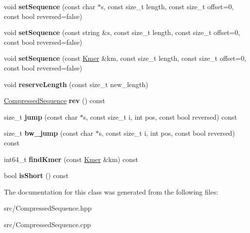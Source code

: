 \begin{DoxyCompactItemize}
\item 
\mbox{\label{classCompressedSequence_ac1a4f5c74c826791b7c98ccd4b7d3ac1}} 
void {\bfseries set\+Sequence} (const char $\ast$s, const size\+\_\+t length, const size\+\_\+t offset=0, const bool reversed=false)
\item 
\mbox{\label{classCompressedSequence_abba3d57bcbf5b1c84c785c48433116a7}} 
void {\bfseries set\+Sequence} (const string \&s, const size\+\_\+t length, const size\+\_\+t offset=0, const bool reversed=false)
\item 
\mbox{\label{classCompressedSequence_af94fc23d0afeb70385bca42d173a3014}} 
void {\bfseries set\+Sequence} (const \hyperlink{classKmer}{Kmer} \&km, const size\+\_\+t length, const size\+\_\+t offset=0, const bool reversed=false)
\item 
\mbox{\label{classCompressedSequence_a29f5262826fbcfdadbd43cc8a780dfe7}} 
void {\bfseries reserve\+Length} (const size\+\_\+t new\+\_\+length)
\item 
\mbox{\label{classCompressedSequence_a28670dcb0eeecc8829e0ec0c6df14942}} 
\hyperlink{classCompressedSequence}{Compressed\+Sequence} {\bfseries rev} () const
\item 
\mbox{\label{classCompressedSequence_a7cb50e4df8826874ef455e404d5a46ce}} 
size\+\_\+t {\bfseries jump} (const char $\ast$s, const size\+\_\+t i, int pos, const bool reversed) const
\item 
\mbox{\label{classCompressedSequence_a5ca12a7bec7e3e58694992c703a22d0d}} 
size\+\_\+t {\bfseries bw\+\_\+jump} (const char $\ast$s, const size\+\_\+t i, int pos, const bool reversed) const
\item 
\mbox{\label{classCompressedSequence_a3ecb83ffa1873cad562bf20dd6f2a073}} 
int64\+\_\+t {\bfseries find\+Kmer} (const \hyperlink{classKmer}{Kmer} \&km) const
\item 
\mbox{\label{classCompressedSequence_a06733cc54a355dd3ff2adb53c50620f1}} 
bool {\bfseries is\+Short} () const
\end{DoxyCompactItemize}


The documentation for this class was generated from the following files\+:\begin{DoxyCompactItemize}
\item 
src/Compressed\+Sequence.\+hpp\item 
src/Compressed\+Sequence.\+cpp\end{DoxyCompactItemize}
